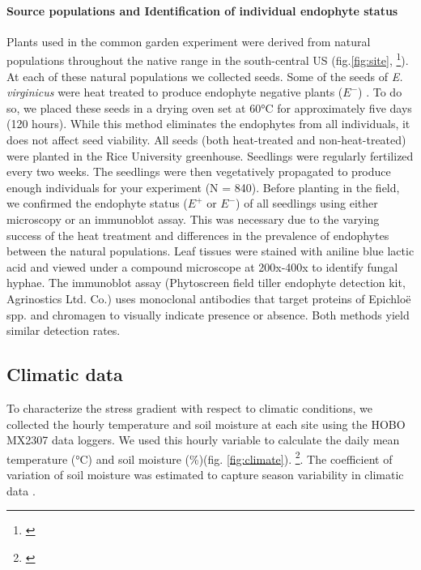 \documentclass[11pt]{article}
\newcommand{\jacob}[2]{{\color{blue}{#1}}\footnote{\textit{\color{blue}{#2}}}}
\begin{document}
\paragraph {Source populations and Identification of individual endophyte status} 
Plants used  in the common garden experiment were derived from natural populations throughout the native range in the south-central US (fig.\ref{fig:site}, \jacob{Table X}{We need this table  in the Appendix}). 
At each of these natural populations we collected seeds. 
Some of the seeds of \emph{E. virginicus} were heat treated to produce endophyte negative plants ($E^-$) . 
To do so, we placed these seeds  in a drying oven set at 60°C for approximately five days (120 hours). 
While this method eliminates the endophytes from all individuals, it does not affect seed viability. 
All seeds (both heat-treated and non-heat-treated) were planted in the Rice University greenhouse.
Seedlings were regularly fertilized every two weeks. 
The seedlings were then vegetatively propagated to produce enough individuals for your experiment (N = 840).
Before planting in the field, we confirmed the endophyte status ($E^+$ or $E^-$) of all  seedlings using either microscopy or an immunoblot assay. 
This was necessary due to the varying success of the heat treatment and differences in the prevalence of endophytes between the natural populations. 
Leaf tissues were stained with aniline blue lactic acid and viewed under a compound microscope at 200x-400x to identify fungal hyphae. 
The immunoblot assay (Phytoscreen field tiller endophyte detection kit, Agrinostics Ltd. Co.) uses monoclonal antibodies that target proteins of Epichloë spp. and chromagen to visually indicate presence or absence. Both methods yield similar detection rates.  

\subsection*{Climatic data}
To characterize the stress gradient with respect to  climatic conditions, we collected the hourly temperature and soil moisture at each site using the HOBO MX2307 data loggers. We used this hourly variable to calculate the daily mean temperature (°C) and soil moisture (\%)(fig. \ref{fig:climate}). 
\jacob{We calculated the mean soil moisture and the coefficient of variation from the time the plants were placed on the ground to the time we collected demographic data}{I will change this  later}. 
The coefficient of variation of soil moisture was estimated to capture season variability in climatic data \citep{medvigy2012trends,meshram2017long}. 
\end{document}
